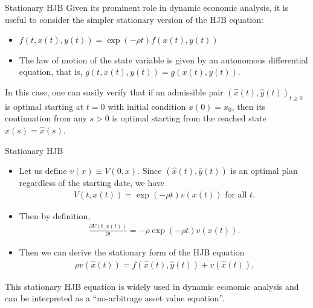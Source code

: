\documentclass[9pt,aspectratio=169]{beamer}
\begin{document}
\begin{frame}{Stationary HJB}
    Given its prominent role in dynamic economic analysis, it is useful to
    consider the simpler stationary version of the HJB equation:
 \begin{itemize}
        \item $f(t, x(t), y(t)) = \exp(-\rho t)f(x(t), y(t))$
        \item The law of motion of the state variable is given by an
        autonomous differential equation, that is, $g(t, x(t), y(t)) =
        g(x(t), y(t))$.
    \end{itemize}

    In this case, one can easily verify that if an admissible pair
    $(\hat{x}(t), \hat{y}(t))_{t \geq 0}$ is optimal starting at $t = 0$ with
    initial condition $x(0) = x_0$, then its continuation from any $s>0$ is
    optimal starting from the reached state $x(s)=\hat{x}(s)$.
\end{frame}

\begin{frame}{Stationary HJB}
    \begin{itemize}
        \item Let us define $v(x) \equiv V(0, x)$. Since $(\hat{x}(t),
        \hat{y}(t))$ is an optimal plan regardless of the starting date, we
        have
        \begin{align}
            V(t, x(t)) = \exp(-\rho t)v(x(t)) \text{ for all } t. \tag{7.43}
        \end{align}
        \item Then by definition,
        \begin{align*}
            \frac{\partial V(t, x(t))}{\partial t} = -\rho \exp(-\rho
            t)v(x(t)).
        \end{align*}
        \item Then we can derive the stationary form of the HJB equation
        \begin{align}
            \rho v(\hat{x}(t)) = f(\hat{x}(t), \hat{y}(t)) +
            \dot{v}(\hat{x}(t)). \tag{7.44}
        \end{align}
    \end{itemize}
    This stationary HJB equation is widely used in dynamic economic analysis
    and can be interpreted as a ``no-arbitrage asset value equation''.
\end{frame}
\end{document}
